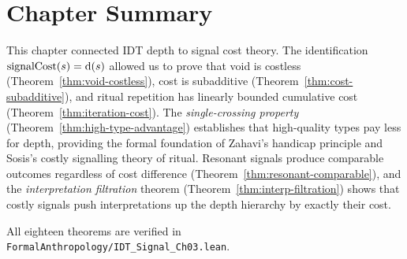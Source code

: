 \section*{Chapter Summary}

This chapter connected IDT depth to signal cost theory.  The
identification $\operatorname{signalCost}(s) = \operatorname{d}(s)$ allowed us to
prove that void is costless (Theorem~\ref{thm:void-costless}), cost is
subadditive (Theorem~\ref{thm:cost-subadditive}), and ritual repetition
has linearly bounded cumulative cost
(Theorem~\ref{thm:iteration-cost}).  The \emph{single-crossing property}
(Theorem~\ref{thm:high-type-advantage}) establishes that high-quality
types pay less for depth, providing the formal foundation of Zahavi's
handicap principle and Sosis's costly signalling theory of ritual.
Resonant signals produce comparable outcomes regardless of cost
difference (Theorem~\ref{thm:resonant-comparable}), and the
\emph{interpretation filtration} theorem
(Theorem~\ref{thm:interp-filtration}) shows that costly signals push
interpretations up the depth hierarchy by exactly their cost.

All eighteen theorems are verified in
\texttt{FormalAnthropology/IDT\_Signal\_Ch03.lean}.
